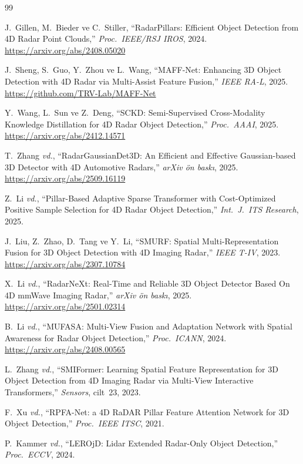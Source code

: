 \documentclass[a4paper,11pt]{article}
\begin{document}
\begin{thebibliography}{99}

J.~Gillen, M.~Bieder ve C.~Stiller,
``RadarPillars: Efficient Object Detection from 4D Radar Point Clouds,''
\textit{Proc.\ IEEE/RSJ IROS}, 2024.
\url{https://arxiv.org/abs/2408.05020}

J.~Sheng, S.~Guo, Y.~Zhou ve L.~Wang,
``MAFF-Net: Enhancing 3D Object Detection with 4D Radar via Multi-Assist Feature Fusion,''
\textit{IEEE RA-L}, 2025.
\url{https://github.com/TRV-Lab/MAFF-Net}

Y.~Wang, L.~Sun ve Z.~Deng,
``SCKD: Semi-Supervised Cross-Modality Knowledge Distillation for 4D Radar Object Detection,''
\textit{Proc.\ AAAI}, 2025.
\url{https://arxiv.org/abs/2412.14571}

T.~Zhang \textit{vd.},
``RadarGaussianDet3D: An Efficient and Effective Gaussian-based 3D Detector with 4D Automotive Radars,''
\textit{arXiv ön baskı}, 2025.
\url{https://arxiv.org/abs/2509.16119}

Z.~Li \textit{vd.},
``Pillar-Based Adaptive Sparse Transformer with Cost-Optimized Positive Sample Selection for 4D Radar Object Detection,''
\textit{Int.\ J.\ ITS Research}, 2025.

J.~Liu, Z.~Zhao, D.~Tang ve Y.~Li,
``SMURF: Spatial Multi-Representation Fusion for 3D Object Detection with 4D Imaging Radar,''
\textit{IEEE T-IV}, 2023.
\url{https://arxiv.org/abs/2307.10784}

X.~Li \textit{vd.},
``RadarNeXt: Real-Time and Reliable 3D Object Detector Based On 4D mmWave Imaging Radar,''
\textit{arXiv ön baskı}, 2025.
\url{https://arxiv.org/abs/2501.02314}

B.~Li \textit{vd.},
``MUFASA: Multi-View Fusion and Adaptation Network with Spatial Awareness for Radar Object Detection,''
\textit{Proc.\ ICANN}, 2024.
\url{https://arxiv.org/abs/2408.00565}

L.~Zhang \textit{vd.},
``SMIFormer: Learning Spatial Feature Representation for 3D Object Detection from 4D Imaging Radar via Multi-View Interactive Transformers,''
\textit{Sensors}, cilt~23, 2023.

F.~Xu \textit{vd.},
``RPFA-Net: a 4D RaDAR Pillar Feature Attention Network for 3D Object Detection,''
\textit{Proc.\ IEEE ITSC}, 2021.

P.~Kammer \textit{vd.},
``LEROjD: Lidar Extended Radar-Only Object Detection,''
\textit{Proc.\ ECCV}, 2024.

\end{thebibliography}
\end{document}
